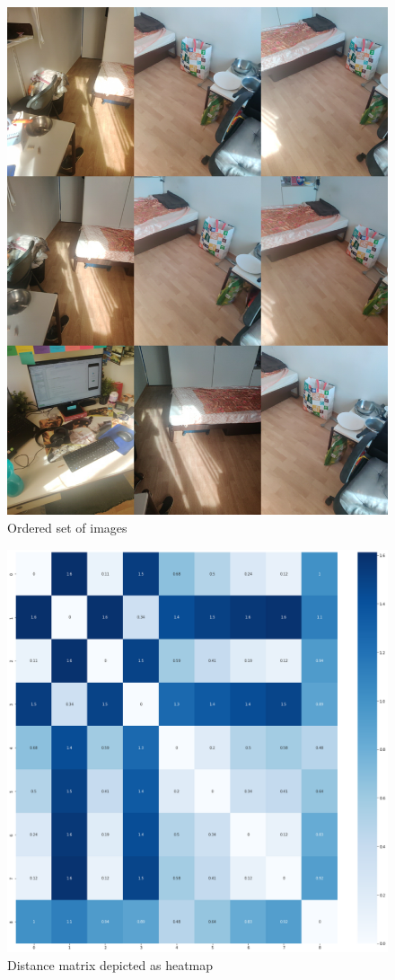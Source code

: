     \begin{figure}
		\centering
		\includegraphics[width=12cm]{images/unordered_images.jpg}
		\caption{Ordered set of images}
		\label{fig:unordered set of images}
	\end{figure}
	
	\begin{figure}
		\centering
		\includegraphics[width=12cm]{images/unordered_D.png}
		\caption{Distance matrix depicted as heatmap}
		\label{fig:unordered set K}
	\end{figure}  
	
